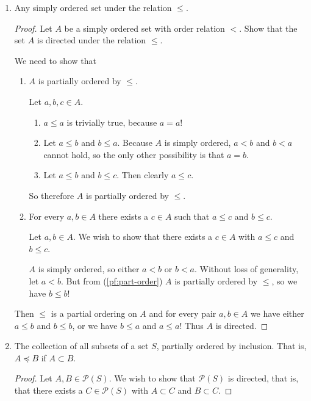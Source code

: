 \documentclass[12pt]{article}
\begin{document}
\begin{enumerate}
    \item Any simply ordered set under the relation $\leq$.
          \begin{proof}
              Let $A$ be a simply ordered set with order relation $<$. Show that the set $A$ is
              directed under the relation $\leq$.

              We need to show that
              \begin{enumerate}
                  \item\label{pf:part-order} $A$ is partially ordered by $\leq$.

                        Let $a, b, c \in A$.
                        \begin{enumerate}
                            \item $a \leq a$ is trivially true, because $a = a$!
                            \item Let $a \leq b$ and $b \leq a$. Because $A$ is simply ordered, $a
                                      < b$ and $b < a$ cannot hold, so the only other possibility
                                  is that $a = b$.
                            \item Let $a \leq b$ and $b \leq c$. Then clearly $a \leq c$.
                        \end{enumerate}
                        So therefore $A$ is partially ordered by $\leq$.
                  \item\label{pf:part-directed} For every $a, b \in A$ there exists a $c \in A$
                        such that $a \leq c$ and $b \leq c$.

                        Let $a, b \in A$. We wish to show that there exists a $c \in A$ with $a
                            \leq c$ and $b \leq c$.

                        $A$ is simply ordered, so either $a < b$ or $b < a$. Without loss of
                        generality, let $a < b$. But from (\ref{pf:part-order}) $A$ is partially
                        ordered by $\leq$, so we
                        have $b \leq b$!
              \end{enumerate}
              Then $\leq$ is a partial ordering on $A$ and for every pair $a, b \in A$ we have
              either $a \leq b$ and $b \leq b$, or we have $b \leq a$ and $a \leq a$! Thus $A$ is
              directed.
          \end{proof}

    \item The collection of all subsets of a set $S$, partially ordered by inclusion. That is, $A
              \preceq B$ if $A \subset B$.
          \begin{proof}
              Let $A, B \in \mathcal P(S)$. We wish to show that $\mathcal P(S)$ is directed, that
              is, that there exists a $C \in \mathcal P(S)$ with $A \subset C$ and $B \subset C$.
          \end{proof}


\end{enumerate}
\end{document}
